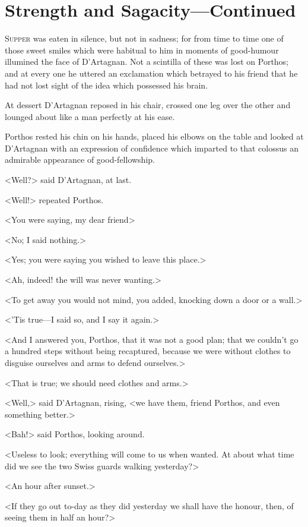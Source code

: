 \chapter{Strength and Sagacity—Continued}
	
\lettrine{S}{upper} was eaten in silence, but not in sadness; for from time to time one of those sweet smiles which were habitual to him in moments of good-humour illumined the face of D'Artagnan. Not a scintilla of these was lost on Porthos; and at every one he uttered an exclamation which betrayed to his friend that he had not lost sight of the idea which possessed his brain.

At dessert D'Artagnan reposed in his chair, crossed one leg over the other and lounged about like a man perfectly at his ease.

Porthos rested his chin on his hands, placed his elbows on the table and looked at D'Artagnan with an expression of confidence which imparted to that colossus an admirable appearance of good-fellowship.

<Well?> said D'Artagnan, at last.

<Well!> repeated Porthos.

<You were saying, my dear friend\longdash>

<No; I said nothing.>

<Yes; you were saying you wished to leave this place.>

<Ah, indeed! the will was never wanting.>

<To get away you would not mind, you added, knocking down a door or a wall.>

<'Tis true—I said so, and I say it again.>

<And I answered you, Porthos, that it was not a good plan; that we couldn't go a hundred steps without being recaptured, because we were without clothes to disguise ourselves and arms to defend ourselves.>

<That is true; we should need clothes and arms.>

<Well,> said D'Artagnan, rising, <we have them, friend Porthos, and even something better.>

<Bah!> said Porthos, looking around.

<Useless to look; everything will come to us when wanted. At about what time did we see the two Swiss guards walking yesterday?>

<An hour after sunset.>

<If they go out to-day as they did yesterday we shall have the honour, then, of seeing them in half an hour?>

